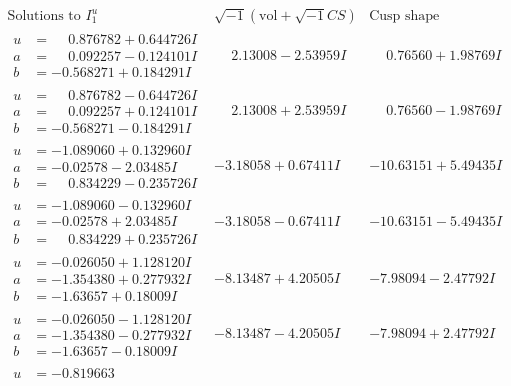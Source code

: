 \documentclass[1p]{elsarticle_modified}
\theoremstyle{definition}
\newcommand{\I}{\sqrt{-1}}
\begin{document}
$$\begin{array}{c|c|c}  
\text{Solutions to }I^u_{1}& \I (\text{vol} + \sqrt{-1}CS) & \text{Cusp shape}\\
 \hline 
\begin{aligned}
u &= \phantom{-}0.876782 + 0.644726 I \\
a &= \phantom{-}0.092257 - 0.124101 I \\
b &= -0.568271 + 0.184291 I\end{aligned}
 & \phantom{-}2.13008 - 2.53959 I & \phantom{-}0.76560 + 1.98769 I \\ \hline\begin{aligned}
u &= \phantom{-}0.876782 - 0.644726 I \\
a &= \phantom{-}0.092257 + 0.124101 I \\
b &= -0.568271 - 0.184291 I\end{aligned}
 & \phantom{-}2.13008 + 2.53959 I & \phantom{-}0.76560 - 1.98769 I \\ \hline\begin{aligned}
u &= -1.089060 + 0.132960 I \\
a &= -0.02578 - 2.03485 I \\
b &= \phantom{-}0.834229 - 0.235726 I\end{aligned}
 & -3.18058 + 0.67411 I & -10.63151 + 5.49435 I \\ \hline\begin{aligned}
u &= -1.089060 - 0.132960 I \\
a &= -0.02578 + 2.03485 I \\
b &= \phantom{-}0.834229 + 0.235726 I\end{aligned}
 & -3.18058 - 0.67411 I & -10.63151 - 5.49435 I \\ \hline\begin{aligned}
u &= -0.026050 + 1.128120 I \\
a &= -1.354380 + 0.277932 I \\
b &= -1.63657 + 0.18009 I\end{aligned}
 & -8.13487 + 4.20505 I & -7.98094 - 2.47792 I \\ \hline\begin{aligned}
u &= -0.026050 - 1.128120 I \\
a &= -1.354380 - 0.277932 I \\
b &= -1.63657 - 0.18009 I\end{aligned}
 & -8.13487 - 4.20505 I & -7.98094 + 2.47792 I \\ \hline\begin{aligned}
u &= -0.819663\phantom{ +0.000000I} \\

\end{aligned}
\end{array}$$
\end{document}
